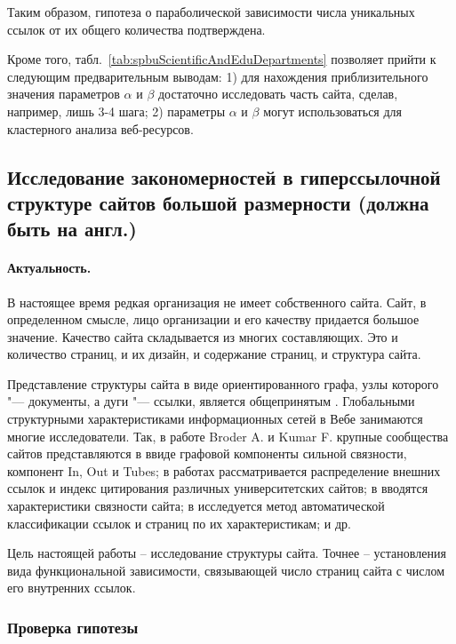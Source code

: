 Таким образом, гипотеза о параболической зависимости числа уникальных ссылок от их общего количества подтверждена.

Кроме того, табл.~\cref{tab:spbuScientificAndEduDepartments} позволяет прийти к следующим предварительным выводам: 1) для нахождения приблизительного значения параметров \(\alpha\) и \(\beta\) достаточно исследовать часть сайта, сделав, например, лишь 3-4 шага; 2) параметры \(\alpha\) и \(\beta\) могут использоваться для кластерного анализа веб-ресурсов.

\subsection{Исследование закономерностей в гиперссылочной структуре сайтов большой размерности (должна быть на англ.)}\label{subsec:ch1/sec4/sub4}

\paragraph{Актуальность.} В настоящее время редкая организация не имеет собственного сайта. Сайт, в определенном смысле, лицо организации и его качеству придается большое значение. Качество сайта складывается из многих составляющих. Это и количество страниц, и их дизайн, и содержание страниц, и структура сайта.

Представление структуры сайта в виде ориентированного графа, узлы которого "--- документы, а дуги "--- ссылки, является общепринятым \cite{BroderKumarMaghoul}. Глобальными структурными характеристиками информационных сетей в Вебе занимаются многие исследователи. Так, в работе Broder A. и Kumar F. \cite{BroderKumarMaghoul} крупные сообщества сайтов представляются в ввиде графовой компоненты сильной связности, компонент In, Out и Tubes; в работах \cite{Thelwall,ThelwallZuccala,ThelwallWilkinsonMusgrove,PechnikovNwohiri} рассматривается распределение внешних ссылок и индекс цитирования различных университетских сайтов; в \cite{BlekanovSergeevMaksimovBOWTIE} вводятся характеристики связности сайта; в \cite{KenekayoroBuckleyThelwall} исследуется метод автоматической классификации ссылок и страниц по их характеристикам; и др.

Цель настоящей работы – исследование структуры сайта. Точнее – установления вида функциональной зависимости, связывающей число страниц сайта с числом его внутренних ссылок.

\subsubsection{Проверка гипотезы}

